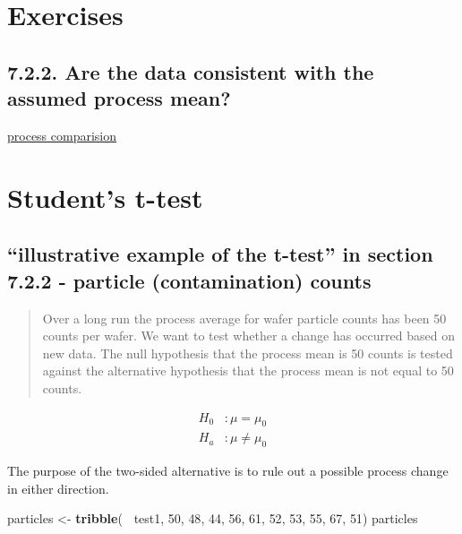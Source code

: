 \documentclass[]{book}
\newenvironment{Shaded}{\begin{snugshade}}{\end{snugshade}}
\newcommand{\DecValTok}[1]{\textcolor[rgb]{0.00,0.00,0.81}{#1}}
\newcommand{\KeywordTok}[1]{\textcolor[rgb]{0.13,0.29,0.53}{\textbf{#1}}}
\newcommand{\NormalTok}[1]{#1}
\newcommand{\OperatorTok}[1]{\textcolor[rgb]{0.81,0.36,0.00}{\textbf{#1}}}
\newcommand{\StringTok}[1]{\textcolor[rgb]{0.31,0.60,0.02}{#1}}
\theoremstyle{definition}
\theoremstyle{definition}
\theoremstyle{definition}
\theoremstyle{remark}
\begin{document}
\hypertarget{exercises}{%
\section{Exercises}\label{exercises}}

\hypertarget{are-the-data-consistent-with-the-assumed-process-mean}{%
\subsection{7.2.2. Are the data consistent with the assumed process
mean?}\label{are-the-data-consistent-with-the-assumed-process-mean}}

\href{https://www.itl.nist.gov/div898/handbook/prc/section2/prc22.htm}{process
comparision}

\hypertarget{students-t-test}{%
\section{Student's t-test}\label{students-t-test}}

\hypertarget{illustrative-example-of-the-t-test-in-section-7.2.2---particle-contamination-counts}{%
\subsection{``illustrative example of the t-test'' in section 7.2.2 -
particle (contamination)
counts}\label{illustrative-example-of-the-t-test-in-section-7.2.2---particle-contamination-counts}}

\begin{quote}
Over a long run the process average for wafer particle counts has been
50 counts per wafer. We want to test whether a change has occurred based
on new data. The null hypothesis that the process mean is 50 counts is
tested against the alternative hypothesis that the process mean is not
equal to 50 counts.
\end{quote}

\[ \begin{aligned}
H_0 &:   \mu = \mu_0 \\
H_a &:  \mu \ne \mu_0
\end{aligned} \]

The purpose of the two-sided alternative is to rule out a possible
process change in either direction.

\begin{Shaded}
\begin{Highlighting}[]
\NormalTok{particles <-}\StringTok{ }\KeywordTok{tribble}\NormalTok{( }\OperatorTok{~}\NormalTok{test1, }\DecValTok{50}\NormalTok{, }\DecValTok{48}\NormalTok{, }\DecValTok{44}\NormalTok{, }\DecValTok{56}\NormalTok{, }\DecValTok{61}\NormalTok{, }\DecValTok{52}\NormalTok{, }\DecValTok{53}\NormalTok{, }\DecValTok{55}\NormalTok{, }\DecValTok{67}\NormalTok{, }\DecValTok{51}\NormalTok{)}
\NormalTok{particles}
\end{Highlighting}
\end{Shaded}
\end{document}
